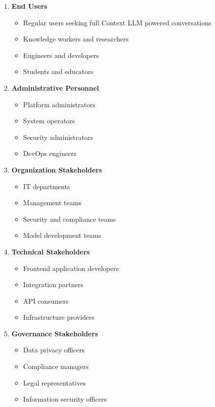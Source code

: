 \begin{enumerate}
   \item \textbf{End Users}
   \begin{itemize}
      \item Regular users seeking full Context LLM powered conversations
      \item Knowledge workers and researchers
      \item Engineers and developers
      \item Students and educators
   \end{itemize}

   \item \textbf{Administrative Personnel}
   \begin{itemize}
      \item Platform administrators
      \item System operators
      \item Security administrators
      \item DevOps engineers
   \end{itemize}

   \item \textbf{Organization Stakeholders}
   \begin{itemize}
      \item IT departments
      \item Management teams
      \item Security and compliance teams
      \item Model development teams
   \end{itemize}

   \item \textbf{Technical Stakeholders}
   \begin{itemize}
      \item Frontend application developers
      \item Integration partners
      \item API consumers
      \item Infrastructure providers
   \end{itemize}

   \item \textbf{Governance Stakeholders}
   \begin{itemize}
      \item Data privacy officers
      \item Compliance managers
      \item Legal representatives
      \item Information security officers
   \end{itemize}
\end{enumerate}

